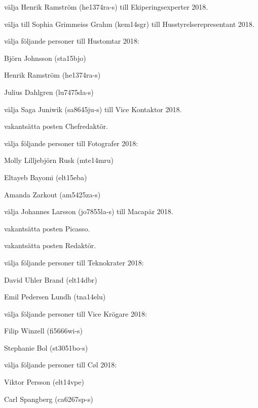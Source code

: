 \documentclass[10pt]{article}
\begin{document}
\begin{paragrafer}
\begin{paralist}
    \Mba välja Henrik Ramström (he1374ra-s) till Ekiperingsexperter 2018.

    \Mba välja till Sophia Grimmeiss Grahm (kem14sgr) till Husstyrelserepresentant 2018.

    \Mba välja följande personer till Hustomtar 2018:
    \begin{tightdashlist}
        \item Björn Johnsson (sta15bjo)
        \item Henrik Ramström (he1374ra-s)
        \item Julius Dahlgren (lu7475da-s)
    \end{tightdashlist}

    \Mba välja Saga Juniwik (sa8645ju-s) till Vice Kontaktor 2018.

    \Mba vakantsätta posten Chefredaktör.

    \Mba välja följande personer till Fotografer 2018:
    \begin{tightdashlist}
        \item Molly Lilljebjörn Rusk (mte14mru)
        \item Eltayeb Bayomi (elt15eba)
        \item Amanda Zarkout (am5425za-s)
    \end{tightdashlist}

    \Mba välja Johannes Larsson (jo7855la-s) till Macapär 2018.

    \Mba vakantsätta posten Picasso.

    \Mba vakantsätta posten Redaktör.

    \Mba välja följande personer till Teknokrater 2018:
    \begin{tightdashlist}
        \item David Uhler Brand (elt14dbr)
        \item Emil Pedersen Lundh (tna14elu)
    \end{tightdashlist}

    \Mba välja följande personer till Vice Krögare 2018:
    \begin{tightdashlist}
        \item Filip Winzell (fi5666wi-s)
        \item Stephanie Bol (st3051bo-s)
    \end{tightdashlist}

    \Mba välja följande personer till Cøl 2018:
    \begin{tightdashlist}
        \item Viktor Persson (elt14vpe)
        \item Carl Spangberg (ca6267sp-s)
    \end{tightdashlist}


\end{paralist}
\end{paragrafer}
\end{document}
